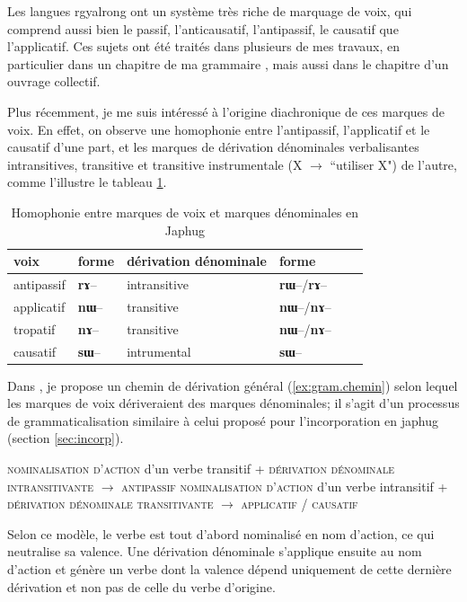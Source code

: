 \documentclass[oldfontcommands,oneside,a4paper,11pt]{memoir}
\newcommand{\ipa}[1]{{\phon\textbf{#1}}}
\begin{document}
Les langues rgyalrong ont un système très riche de marquage de voix, qui comprend aussi bien le passif, l'anticausatif, l'antipassif, le causatif que l'applicatif. Ces sujets ont été traités dans plusieurs de mes travaux, en particulier dans un chapitre de ma grammaire \citet{jacques08zh}, mais aussi dans le chapitre \citet{jacques12demotion} d'un ouvrage collectif. 


Plus récemment, je me suis intéressé à l'origine diachronique de ces marques de voix. En effet, on observe une homophonie entre l'antipassif, l'applicatif et le causatif d'une part, et les marques de dérivation dénominales verbalisantes intransitives, transitive et transitive instrumentale (X $\rightarrow$ ``utiliser X") de l'autre, comme l'illustre le tableau \ref{tab:homophonie}.


\begin{table}[H]
\caption{Homophonie entre marques de voix et marques dénominales en Japhug } \label{tab:homophonie} \centering
\begin{tabular}{llllll}
\toprule
voix& forme&dérivation dénominale& forme \\
\midrule
  antipassif&\ipa{rɤ}--&intransitive&\ipa{rɯ}--/\ipa{rɤ}--   \\
 applicatif&\ipa{nɯ}--&transitive&\ipa{nɯ}--/\ipa{nɤ}--   \\
 tropatif&\ipa{nɤ}--&transitive&\ipa{nɯ}--/\ipa{nɤ}--   \\
 causatif&\ipa{sɯ}--&intrumental&\ipa{sɯ}--    \\
\bottomrule
\end{tabular}
\end{table}

Dans \citet{jacques14antipassive}, je propose un chemin de dérivation général (\ref{ex:gram.chemin}) selon lequel les marques de voix dériveraient des marques dénominales; il s'agit d'un processus de grammaticalisation similaire à celui proposé pour l'incorporation en japhug (section \ref{sec:incorp}).


\begin{exe}
\ex \label{ex:gram.chemin}
\glt \textsc{nominalisation d'action} d'un verbe transitif + \textsc{dérivation dénominale intransitivante} $\rightarrow$ \textsc{antipassif}
\glt \textsc{nominalisation d'action} d'un verbe intransitif  + \textsc{dérivation dénominale  transitivante} $\rightarrow$ \textsc{applicatif} / \textsc{causatif}
\end{exe}


Selon ce modèle, le verbe est tout d'abord nominalisé en nom d'action, ce qui neutralise  sa valence. Une dérivation dénominale  s'applique ensuite au nom d'action et génère un verbe dont la valence dépend uniquement de cette dernière dérivation et non pas de celle du verbe d'origine. 
\end{document}
